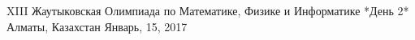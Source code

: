 \documentclass [11pt, a4paper, oneside] {article}
\begin{document}
\contest
{XIII Жаутыковская Олимпиада по Математике, Физике и Информатике *День 2*}%
{Алматы, Казахстан}%
{Январь, 15, 2017}%


\renewcommand{\t}{\texttt}
\end{document}
